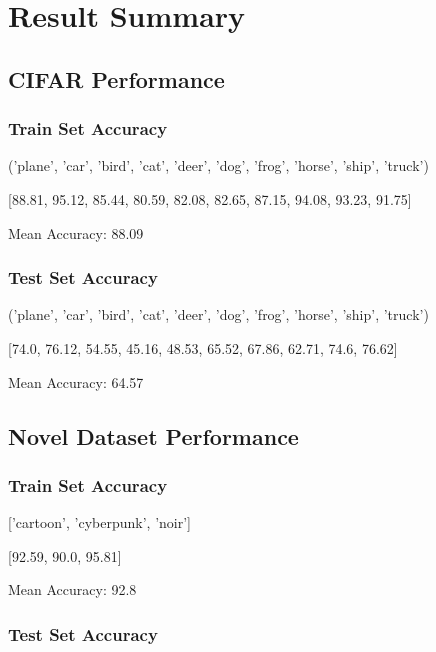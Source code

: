 \documentclass[11pt]{article}
\begin{document}
    \section{Result Summary}\label{result-summary}

\subsection{CIFAR Performance}\label{cifar-performance}

\subsubsection*{Train Set Accuracy}\label{train-set-accuracy}

('plane', 'car', 'bird', 'cat', 'deer', 'dog', 'frog', 'horse', 'ship',
'truck')

{[}88.81, 95.12, 85.44, 80.59, 82.08, 82.65, 87.15, 94.08, 93.23,
91.75{]}

Mean Accuracy: 88.09

\subsubsection*{Test Set Accuracy}\label{test-set-accuracy}

('plane', 'car', 'bird', 'cat', 'deer', 'dog', 'frog', 'horse', 'ship',
'truck')

{[}74.0, 76.12, 54.55, 45.16, 48.53, 65.52, 67.86, 62.71, 74.6, 76.62{]}

Mean Accuracy: 64.57

\subsection{Novel Dataset Performance}\label{novel-dataset-performance}

\subsubsection*{Train Set Accuracy}\label{train-set-accuracy-1}

{[}'cartoon', 'cyberpunk', 'noir'{]}

{[}92.59, 90.0, 95.81{]}

Mean Accuracy: 92.8

\subsubsection*{Test Set Accuracy}\label{test-set-accuracy-1}
\end{document}
